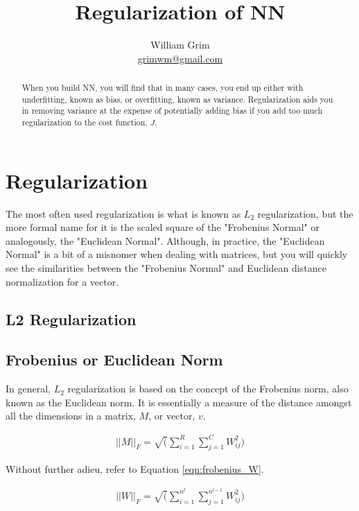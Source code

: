 \documentclass{article}
\begin{document}
\title {Regularization of NN}
\author{William Grim \\ \href{mailto:grimwm@gmail.com}{grimwm@gmail.com}}

\maketitle

\begin{abstract}
When you build NN, you will find that in many cases, you end up either with underfitting, known as bias, or overfitting, known as variance.  Regularization aids you in removing variance at the expense of potentially adding bias if you add too much regularization to the cost function, $J$.
\end{abstract}

\section{Regularization}

The most often used regularization is what is known as $L_{2}$ regularization, but the more formal name for it is the scaled square of the "Frobenius Normal" or analogously, the "Euclidean Normal".  Although, in practice, the "Euclidean Normal" is a bit of a misnomer when dealing with matrices, but you will quickly see the similarities between the "Frobenius Normal" and Euclidean distance normalization for a vector.

\subsection{L2 Regularization}

\subsection{Frobenius or Euclidean Norm}

In general, $L_2$ regularization is based on the concept of the Frobenius norm, also known as the Euclidean norm.  It is essentially a measure of the distance amongst all the dimensions in a matrix, $M$, or vector, $v$.

\begin{align} \label{eqn:frobenius}
||M||_{F} = \sqrt(\sum_{i=1}^{R} \sum_{j=1}^{C} W_{ij}^{2})
\end{align}

Without further adieu, refer to Equation \ref{eqn:frobenius_W}.

\begin{align} \label{eqn:frobenius_W}
||W||_{F} = \sqrt(\sum_{i=1}^{n^{l}} \sum_{j=1}^{n^{l-1}} W_{ij}^{2})
\end{align}
\end{document}
